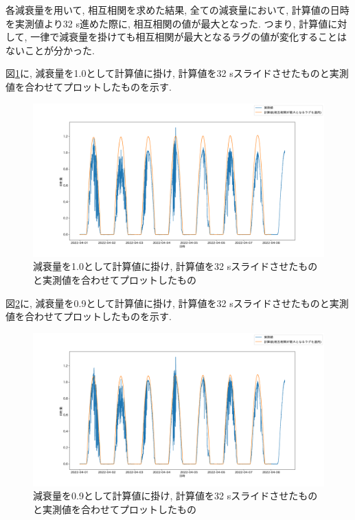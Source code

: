 \documentclass[a4j,12pt,]{jarticle}
\begin{document}
各減衰量を用いて, 相互相関を求めた結果, 全ての減衰量において, 計算値の日時を実測値より32 \si{\second}進めた際に, 相互相関の値が最大となった.
つまり, 計算値に対して, 一律で減衰量を掛けても相互相関が最大となるラグの値が変化することはないことが分かった.

図\ref{p2}に, 減衰量を1.0として計算値に掛け, 計算値を32 \si{\second}スライドさせたものと実測値を合わせてプロットしたものを示す.

\begin{figure}[H]
  \begin{center}
    \includegraphics[width=160mm]{1.0.png}
    \caption{減衰量を1.0として計算値に掛け, 計算値を32 \si{\second}スライドさせたものと実測値を合わせてプロットしたもの}
    \label{p2}
  \end{center}
\end{figure}

図\ref{p3}に, 減衰量を0.9として計算値に掛け, 計算値を32 \si{\second}スライドさせたものと実測値を合わせてプロットしたものを示す.

\begin{figure}[H]
  \begin{center}
    \includegraphics[width=160mm]{0.9.png}
    \caption{減衰量を0.9として計算値に掛け, 計算値を32 \si{\second}スライドさせたものと実測値を合わせてプロットしたもの}
    \label{p3}
  \end{center}
\end{figure}
\end{document}
